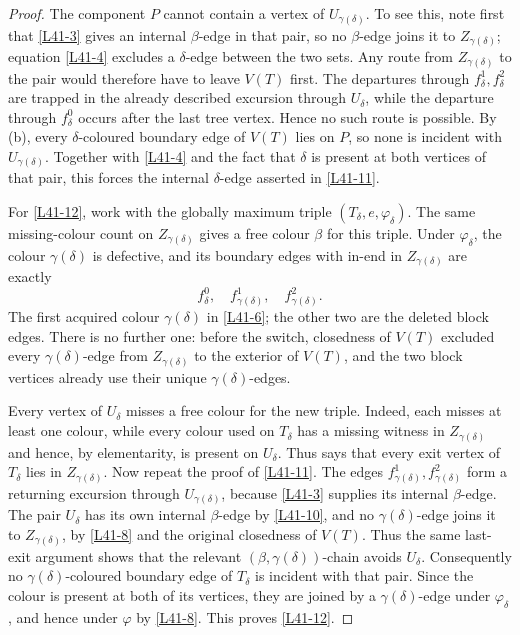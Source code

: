 \documentclass[11pt]{article}
\theoremstyle{definition}
\begin{document}
\begin{proof}
The component $P$ cannot contain a vertex of
$U_{\gamma(\delta)}$. To see this, note first that \eqref{L41-3} gives an
internal $\beta$-edge in that pair, so no $\beta$-edge joins it to
$Z_{\gamma(\delta)}$; equation \eqref{L41-4} excludes a $\delta$-edge
between the two sets. Any route from $Z_{\gamma(\delta)}$ to the pair would
therefore have to leave $V(T)$ first. The departures through
$f^1_\delta,f^2_\delta$ are trapped in the already described excursion
through $U_\delta$, while the departure through $f^0_\delta$ occurs after
the last tree vertex. Hence no such route is possible. By
(b), every $\delta$-coloured boundary edge of
$V(T)$ lies on $P$, so none is incident with
$U_{\gamma(\delta)}$. Together with \eqref{L41-4} and the fact that
$\delta$ is present at both vertices of that pair, this forces the internal
$\delta$-edge asserted in \eqref{L41-11}.

For \eqref{L41-12}, work with the globally maximum triple
$(T_\delta,e,\varphi_\delta)$. The same missing-colour count on
$Z_{\gamma(\delta)}$ gives a free colour $\beta$ for this triple. Under
$\varphi_\delta$, the colour $\gamma(\delta)$ is defective, and its
boundary edges with in-end in $Z_{\gamma(\delta)}$ are exactly
\[
 f^0_\delta,
 \quad f^1_{\gamma(\delta)},
 \quad f^2_{\gamma(\delta)}.
\]
The first acquired colour $\gamma(\delta)$ in \eqref{L41-6}; the other two
are the deleted block edges. There is no further one: before the switch,
closedness of $V(T)$ excluded every $\gamma(\delta)$-edge from
$Z_{\gamma(\delta)}$ to the exterior of $V(T)$, and the two block vertices
already use their unique $\gamma(\delta)$-edges.

Every vertex of $U_\delta$ misses a free colour for the new triple. Indeed,
each misses at least one colour, while every colour used on $T_\delta$ has
a missing witness in $Z_{\gamma(\delta)}$ and hence, by elementarity, is
present on $U_\delta$. Thus  says that every exit vertex
of $T_\delta$ lies in $Z_{\gamma(\delta)}$. Now repeat the proof of
\eqref{L41-11}. The edges
$f^1_{\gamma(\delta)},f^2_{\gamma(\delta)}$ form a returning excursion
through $U_{\gamma(\delta)}$, because \eqref{L41-3} supplies its internal
$\beta$-edge. The pair $U_\delta$ has its own internal $\beta$-edge by
\eqref{L41-10}, and no $\gamma(\delta)$-edge joins it to
$Z_{\gamma(\delta)}$, by \eqref{L41-8} and the original closedness of
$V(T)$. Thus the same last-exit argument shows that the relevant
$(\beta,\gamma(\delta))$-chain avoids $U_\delta$. Consequently no
$\gamma(\delta)$-coloured boundary edge of $T_\delta$ is incident with
that pair. Since the colour is present at both of its vertices, they are
joined by a $\gamma(\delta)$-edge under $\varphi_\delta$, and hence under
$\varphi$ by \eqref{L41-8}. This proves \eqref{L41-12}.


\end{proof}
\end{document}
